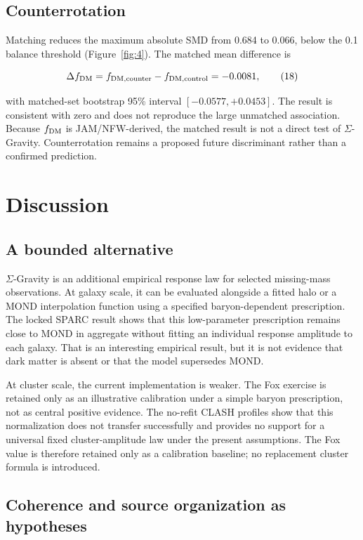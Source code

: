 \documentclass[utf8]{FrontiersinHarvard}
\begin{document}
\subsection{Counterrotation}\label{counterrotation}

Matching reduces the maximum absolute SMD from 0.684 to 0.066, below the 0.1 balance threshold (Figure~\ref{fig:4}). The matched mean difference is

\[
\Delta f_{\rm DM}
=f_{{\rm DM},{\rm counter}}-f_{{\rm DM},{\rm control}}
=-0.0081 ,
\tag{18}
\]

with matched-set bootstrap 95\% interval \([-0.0577,+0.0453]\). The result is consistent with zero and does not reproduce the large unmatched association. Because \(f_{\rm DM}\) is JAM/NFW-derived, the matched result is not a direct test of \(\Sigma\)-Gravity. Counterrotation remains a proposed future discriminant rather than a confirmed prediction.

\section{Discussion}\label{discussion}

\subsection{A bounded alternative}\label{a-bounded-alternative}

\(\Sigma\)-Gravity is an additional empirical response law for selected missing-mass observations. At galaxy scale, it can be evaluated alongside a fitted halo or a MOND interpolation function using a specified baryon-dependent prescription. The locked SPARC result shows that this low-parameter prescription remains close to MOND in aggregate without fitting an individual response amplitude to each galaxy. That is an interesting empirical result, but it is not evidence that dark matter is absent or that the model supersedes MOND.

At cluster scale, the current implementation is weaker. The Fox exercise is retained only as an illustrative calibration under a simple baryon prescription, not as central positive evidence. The no-refit CLASH profiles show that this normalization does not transfer successfully and provides no support for a universal fixed cluster-amplitude law under the present assumptions. The Fox value is therefore retained only as a calibration baseline; no replacement cluster formula is introduced.

\subsection{Coherence and source organization as hypotheses}\label{coherence-and-source-organization-as-hypotheses}
\end{document}
